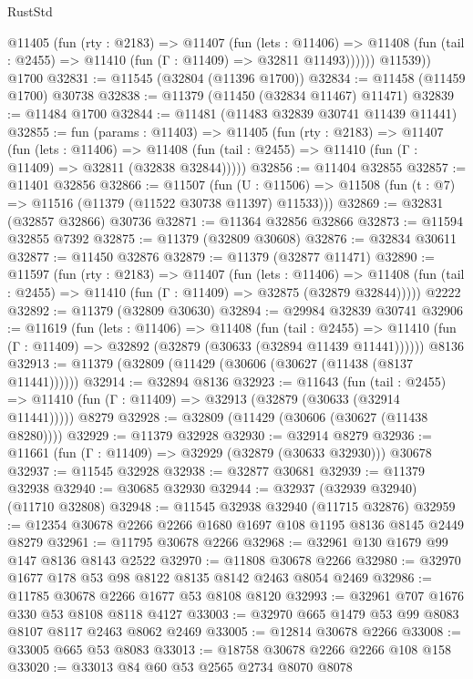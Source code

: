 \begin{lexlean}{RustStd}
\begin{coremodule}
          @11405
            (fun (rty : @2183) =>
            @11407
              (fun (lets : @11406) =>
              @11408 (fun (tail : @2455) => @11410 (fun (Γ : @11409) => @32811 @11493))))))
        @11539))
    @1700
@32831 := @11545 (@32804 (@11396 @1700))
@32834 := @11458 (@11459 @1700) @30738
@32838 := @11379 (@11450 (@32834 @11467) @11471)
@32839 := @11484 @1700
@32844 := @11481 (@11483 @32839 @30741 @11439 @11441)
@32855 := fun (params : @11403) =>
  @11405
    (fun (rty : @2183) =>
    @11407
      (fun (lets : @11406) =>
      @11408 (fun (tail : @2455) => @11410 (fun (Γ : @11409) => @32811 (@32838 @32844)))))
@32856 := @11404 @32855
@32857 := @11401 @32856
@32866 := @11507
    (fun (U : @11506) => @11508 (fun (t : @7) => @11516 (@11379 (@11522 @30738 @11397) @11533)))
@32869 := @32831 (@32857 @32866) @30736
@32871 := @11364 @32856 @32866
@32873 := @11594 @32855 @7392
@32875 := @11379 (@32809 @30608)
@32876 := @32834 @30611
@32877 := @11450 @32876
@32879 := @11379 (@32877 @11471)
@32890 := @11597
    (fun (rty : @2183) =>
    @11407
      (fun (lets : @11406) =>
      @11408 (fun (tail : @2455) => @11410 (fun (Γ : @11409) => @32875 (@32879 @32844)))))
    @2222
@32892 := @11379 (@32809 @30630)
@32894 := @29984 @32839 @30741
@32906 := @11619
    (fun (lets : @11406) =>
    @11408
      (fun (tail : @2455) =>
      @11410 (fun (Γ : @11409) => @32892 (@32879 (@30633 (@32894 @11439 @11441))))))
    @8136
@32913 := @11379 (@32809 (@11429 (@30606 (@30627 (@11438 (@8137 @11441))))))
@32914 := @32894 @8136
@32923 := @11643
    (fun (tail : @2455) => @11410 (fun (Γ : @11409) => @32913 (@32879 (@30633 (@32914 @11441)))))
    @8279
@32928 := @32809 (@11429 (@30606 (@30627 (@11438 @8280))))
@32929 := @11379 @32928
@32930 := @32914 @8279
@32936 := @11661 (fun (Γ : @11409) => @32929 (@32879 (@30633 @32930))) @30678
@32937 := @11545 @32928
@32938 := @32877 @30681
@32939 := @11379 @32938
@32940 := @30685 @32930
@32944 := @32937 (@32939 @32940) (@11710 @32808)
@32948 := @11545 @32938 @32940 (@11715 @32876)
@32959 := @12354 @30678 @2266 @2266 @1680 @1697 @108 @1195 @8136 @8145 @2449 @8279
@32961 := @11795 @30678 @2266
@32968 := @32961 @130 @1679 @99 @147 @8136 @8143 @2522
@32970 := @11808 @30678 @2266
@32980 := @32970 @1677 @178 @53 @98 @8122 @8135 @8142 @2463 @8054 @2469
@32986 := @11785 @30678 @2266 @1677 @53 @8108 @8120
@32993 := @32961 @707 @1676 @330 @53 @8108 @8118 @4127
@33003 := @32970 @665 @1479 @53 @99 @8083 @8107 @8117 @2463 @8062 @2469
@33005 := @12814 @30678 @2266
@33008 := @33005 @665 @53 @8083
@33013 := @18758 @30678 @2266 @2266 @108 @158
@33020 := @33013 @84 @60 @53 @2565 @2734 @8070 @8078

\end{coremodule}
\end{lexlean}
